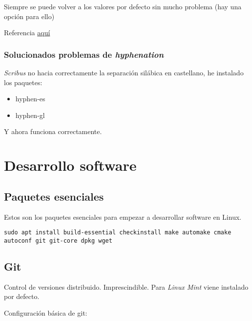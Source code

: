 \documentclass[
  12pt,
  spanish,
]{article}
\providecommand{\tightlist}{%
  \setlength{\itemsep}{0pt}\setlength{\parskip}{0pt}}
\begin{document}
Siempre se puede volver a los valores por defecto sin mucho problema
(hay una opción para ello)

Referencia
\href{https://www.youtube.com/watch?v=3sEoYZGABQM\&list=PL3kOqLpV3a67b13TY3WxYVzErYUOLYekI}{aquí}

\hypertarget{solucionados-problemas-de-hyphenation}{%
\subsubsection{\texorpdfstring{Solucionados problemas de
\emph{hyphenation}}{Solucionados problemas de hyphenation}}\label{solucionados-problemas-de-hyphenation}}

\emph{Scribus} no hacia correctamente la separación silábica en
castellano, he instalado los paquetes:

\begin{itemize}
\tightlist
\item
  hyphen-es
\item
  hyphen-gl
\end{itemize}

Y ahora funciona correctamente.

\hypertarget{desarrollo-software}{%
\section{Desarrollo software}\label{desarrollo-software}}

\hypertarget{paquetes-esenciales}{%
\subsection{Paquetes esenciales}\label{paquetes-esenciales}}

Estos son los paquetes esenciales para empezar a desarrollar software en
Linux.

\begin{verbatim}
sudo apt install build-essential checkinstall make automake cmake autoconf git git-core dpkg wget
\end{verbatim}

\hypertarget{git}{%
\subsection{Git}\label{git}}

Control de versiones distribuido. Imprescindible. Para \emph{Linux Mint}
viene instalado por defecto.

Configuración básica de git:
\end{document}
